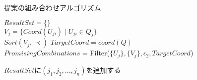\IncMargin{1em}
\removelatexerror
\begin{algorithm*}[H]
\caption{提案の組み合わせアルゴリズム}
\label{algo:ca}
{}
\SetInd{0.5em}{1em}
\SetNlSkip{1em}

\BlankLine
$ResultSet = \lbrace \rbrace$\\
 {
 $V_j = \lbrace Coord(U_{ji}) \mid U_{ji} \in Q_j \rbrace$\\
 $Sort(V_j, \prec)$
}
$TargetCoord = coord(Q)$\\
$PromisingCombinations$ = Filter($\lbrace U_j \rbrace, \lbrace V_j \rbrace, \epsilon_2, TargetCoord$) \\
 {


 {
	$ResultSet$に${(j_1, j_2, ..., j_n)}$を追加する
}
}
\\
\end{algorithm*}
\DecMargin{1em}